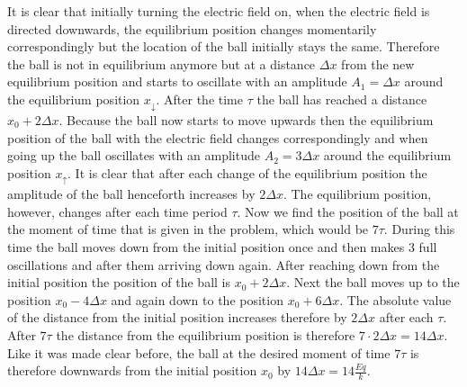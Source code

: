 It is clear that initially turning the electric field on, when the electric field is directed downwards, the equilibrium position changes momentarily correspondingly but the location of the ball initially stays the same. Therefore the ball is not in equilibrium anymore but at a distance $\Delta x$ from the new equilibrium position and starts to oscillate with an amplitude $A_1 = \Delta x$ around the equilibrium position $x_\downarrow$. After the time $\tau$ the ball has reached a distance $x_0 + 2\Delta x$. Because the ball now starts to move upwards then the equilibrium position of the ball with the electric field changes correspondingly and when going up the ball oscillates with an amplitude $A_2 = 3 \Delta x$ around the equilibrium position $x_\uparrow$. It is clear that after each change of the equilibrium position the amplitude of the ball henceforth increases by $2 \Delta x$. The equilibrium position, however, changes after each time period $\tau$. Now we find the position of the ball at the moment of time that is given in the problem, which would be $7 \tau$. During this time the ball moves down from the initial position once and then makes $3$ full oscillations and after them arriving down again. After reaching down from the initial position the position of the ball is $x_0 + 2 \Delta x $. Next the ball moves up to the position $x_0 - 4 \Delta x$ and again down to the position $x_0 + 6 \Delta x$. The absolute value of the distance from the initial position increases therefore by $2 \Delta x$ after each $\tau$. After $7 \tau$ the distance from the equilibrium position is therefore $7 \cdot 2 \Delta x = 14 \Delta x$. Like it was made clear before, the ball at the desired moment of time $7 \tau$ is therefore downwards from the initial position $x_0$ by $14 \Delta x = 14 \frac{Eq}{k}$.
\probend